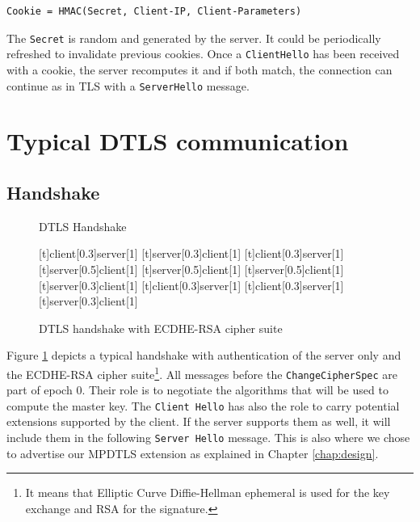 \begin{lstlisting}
Cookie = HMAC(Secret, Client-IP, Client-Parameters)
\end{lstlisting}

The \texttt{Secret} is random and generated by the server. It could be periodically refreshed to invalidate previous cookies. Once a \texttt{ClientHello} has been received with a cookie, the server recomputes it and if both match, the connection can continue as in TLS with a \texttt{ServerHello} message.

\section{Typical DTLS communication}

\subsection{Handshake}

\begin{figure}[!h]
\centering
\begin{msc}[r]{DTLS Handshake}

\setlength{\instfootheight}{0em}
\setlength{\instheadheight}{0em}
\setlength{\instdist}{0.7\linewidth}
\setlength{\levelheight}{3em}


[t]{client}[0.3]{server}[1]
\nextlevel
{}[t]{server}[0.3]{client}[1]
\nextlevel
{}[t]{client}[0.3]{server}[1]
\nextlevel
{}[t]{server}[0.5]{client}[1]
\nextlevel
{}[t]{server}[0.5]{client}[1]
\nextlevel
{}[t]{server}[0.5]{client}[1]
\nextlevel
{}[t]{server}[0.3]{client}[1]
\nextlevel
{}[t]{client}[0.3]{server}[1]
\nextlevel
{}[t]{client}[0.3]{server}[1]
\nextlevel
{}[t]{server}[0.3]{client}[1]
\nextlevel
\nextlevel
\end{msc}
\caption{DTLS handshake with ECDHE-RSA cipher suite}
\label{fig:dtls-handshake}
\end{figure}


Figure \ref{fig:dtls-handshake} depicts a typical handshake with authentication of the server only and the ECDHE-RSA cipher suite\footnote{It means that Elliptic Curve Diffie-Hellman ephemeral is used for the key exchange and RSA for the signature.}. All messages before the \texttt{ChangeCipherSpec} are part of epoch 0. Their role is to negotiate the algorithms that will be used to compute the master key. The \texttt{Client Hello} has also the role to carry potential extensions supported by the client. If the server supports them as well, it will include them in the following \texttt{Server Hello} message. This is also where we chose to advertise our MPDTLS extension as explained in Chapter \ref{chap:design}.

